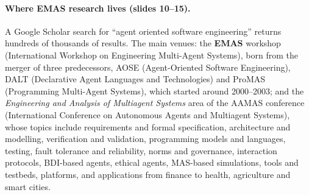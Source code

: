 \paragraph{Where EMAS research lives (slides 10--15).} A Google Scholar search for ``agent
oriented software engineering'' returns hundreds of thousands of results. The main venues:
the \textbf{EMAS} workshop (International Workshop on Engineering Multi-Agent Systems),
born from the merger of three predecessors, AOSE (Agent-Oriented Software Engineering),
DALT (Declarative Agent Languages and Technologies) and ProMAS (Programming Multi-Agent
Systems), which started around 2000--2003; and the \emph{Engineering and Analysis of
Multiagent Systems} area of the AAMAS conference (International Conference on Autonomous
Agents and Multiagent Systems), whose topics include requirements and formal specification,
architecture and modelling, verification and validation, programming models and languages,
testing, fault tolerance and reliability, norms and governance, interaction protocols,
BDI-based agents, ethical agents, MAS-based simulations, tools and testbeds, platforms, and
applications from finance to health, agriculture and smart cities.
